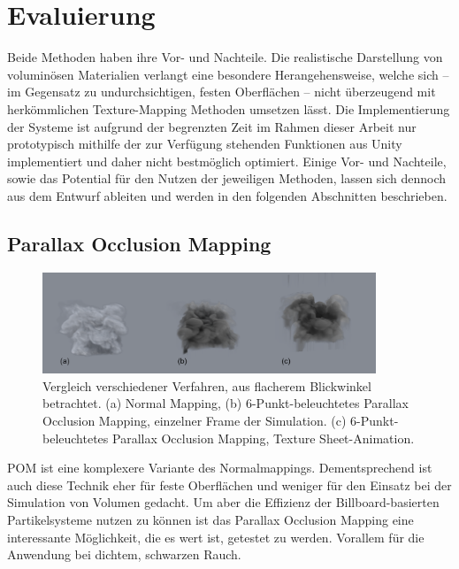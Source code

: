 \section{Evaluierung }
\label{sec:5}

Beide Methoden haben ihre Vor- und Nachteile. Die realistische Darstellung von voluminösen Materialien verlangt
eine besondere Herangehensweise, welche sich – im Gegensatz zu undurchsichtigen, festen Oberflächen –
nicht überzeugend mit herkömmlichen Texture-Mapping Methoden umsetzen lässt.
Die Implementierung der Systeme ist aufgrund der begrenzten Zeit im Rahmen dieser Arbeit nur prototypisch mithilfe der
zur Verfügung stehenden Funktionen aus Unity implementiert und daher nicht bestmöglich optimiert.
Einige Vor- und Nachteile, sowie das Potential für den Nutzen der jeweiligen Methoden, lassen sich dennoch aus dem Entwurf
ableiten und werden in den folgenden Abschnitten beschrieben.


\subsection{Parallax Occlusion Mapping}
\label{sec:5.1}
\begin{figure}[!h]
	\centering
	\includegraphics[width=0.89\textwidth]{Grafiken/Implementation/pom_Vergleich.png}
	\begin{footnotesize}
		\caption{Vergleich verschiedener Verfahren, aus flacherem Blickwinkel betrachtet. 
		(a) Normal Mapping, (b) 6-Punkt-beleuchtetes Parallax Occlusion Mapping, einzelner Frame der Simulation. (c) 6-Punkt-beleuchtetes Parallax Occlusion Mapping, Texture Sheet-Animation. }
		\label{fig:pomVergleich}
	\end{footnotesize}
\end{figure}

POM ist eine komplexere Variante des Normalmappings. Dementsprechend ist auch diese Technik eher für feste Oberflächen und weniger
für den Einsatz bei der Simulation von Volumen gedacht. Um aber die Effizienz der Billboard-basierten Partikelsysteme
nutzen zu können ist das Parallax Occlusion Mapping eine interessante Möglichkeit, die es wert ist, getestet zu werden. Vorallem für die Anwendung bei dichtem, schwarzen Rauch.

